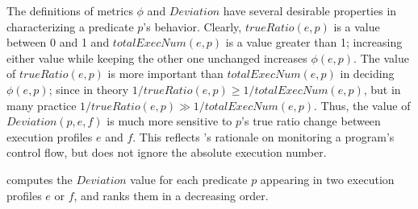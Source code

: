 The definitions of metrics $\phi$ and $Deviation$ have several desirable properties
in characterizing a predicate $p$'s behavior. Clearly, $trueRatio(e,p)$
is a value between 0 and 1 and $totalExecNum(e, p)$ is a value greater than 1; increasing
either value while keeping the other one unchanged increases $\phi(e, p)$.
The value of $trueRatio(e, p)$ is more important than $totalExecNum(e, p)$
in deciding $\phi(e, p)$; since in theory $1/trueRatio(e, p) \geq 1/totalExecNum(e, p)$, but
in many practice $1/trueRatio(e, p) \gg 1/totalExecNum(e, p)$.
Thus, the value of $Deviation(p, e, f)$ is much more sensitive to $p$'s
true ratio change between execution profiles $e$ and $f$. This reflects 
\ourtool's rationale on monitoring a program's control flow, but does not
ignore the absolute execution number.




\ourtool computes the $Deviation$ value for each predicate $p$
appearing in two execution profiles $e$ or $f$, and
ranks them in a decreasing order. 







